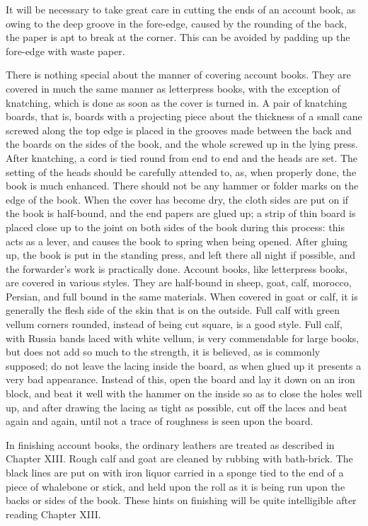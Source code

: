 \documentclass[twoside]{book}
\begin{document}
It will be necessary to take great care in cutting
the ends of an account book, as owing to the
deep groove in the fore-edge, caused by the rounding
of the back, the paper is apt to break at the
corner. This can be avoided by padding up the
fore-edge with waste paper.

There is nothing special about the manner of
covering account books. They are covered in much
the same manner as letterpress books, with the
exception of knatching, which is done as soon as
the cover is turned in. A pair of knatching boards,
that is, boards with a projecting piece about the
thickness of a small cane screwed along the top
edge is placed in the grooves made between the
back and the boards on the sides of the book, and
the whole screwed up in the lying press. After
knatching, a cord is tied round from end to end and
the heads are set. The setting of the heads should
be carefully attended to, as, when properly done,
the book is much enhanced. There should not be
any hammer or folder marks on the edge of the
book. When the cover has become dry, the cloth
sides are put on if the book is half-bound, and the
end papers are glued up; a strip of thin board is
placed close up to the joint on both sides of the
book during this process: this acts as a lever, and
causes the book to spring when being opened.
After gluing up, the book is put in the standing
press, and left there all night if possible, and the
forwarder's work is practically done.
Account books, like letterpress books, are
covered in various styles. They are half-bound in
\pagebreak
sheep, goat, calf, morocco, Persian, and full bound
in the same materials. When covered in goat or
calf, it is generally the flesh side of the skin that
is on the outside. Full calf with green vellum
corners rounded, instead of being cut square, is a
good style. Full calf, with Russia bands laced with
white vellum, is very commendable for large books,
but does not add so much to the strength, it is
believed, as is commonly supposed; do not leave
the lacing inside the board, as when glued up it
presents a very bad appearance. Instead of this,
open the board and lay it down on an iron block,
and beat it well with the hammer on the inside so
as to close the holes well up, and after drawing the
lacing as tight as possible, cut off the laces and
beat again and again, until not a trace of roughness
is seen upon the board.

In finishing account books, the ordinary leathers
are treated as described in Chapter XIII. Rough
calf and goat are cleaned by rubbing with bath-brick.
The black lines are put on with iron liquor carried in
a sponge tied to the end of a piece of whalebone or
stick, and held upon the roll as it is being run upon
the backs or sides of the book. These hints on
finishing will be quite intelligible after reading
Chapter XIII.
\end{document}
